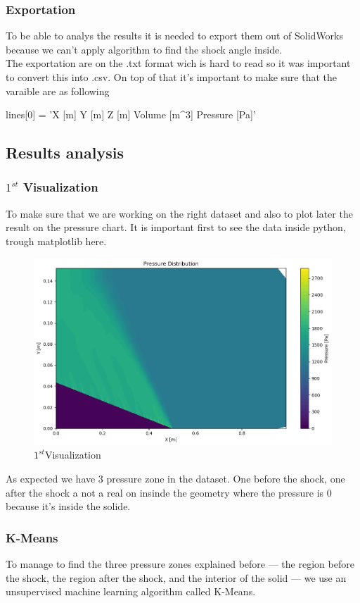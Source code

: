 \subsubsection{Exportation}
To be able to analys the results it is needed to export them out of SolidWorks because we can't apply algorithm to find the shock angle inside. \\
The exportation are on the .txt format wich is hard to read so it was important to convert this into .csv. On top of that it's important to make sure that the varaible are as following

\begin{pycode}
lines[0] = 'X [m] Y [m] Z [m] Volume [m^3] Pressure [Pa]\n'
\end{pycode}



\subsection{Results analysis}

\subsubsection{$1^{st}$ Visualization}
To make sure that we are working on the right dataset and also to plot later the result on the pressure chart. It is important first to see the data inside python, trough matplotlib here.

\begin{figure}[H]
	\centering
	\includegraphics[width=0.5\linewidth]{ressources/figures/PressureDistribution.png}
	\caption{$1^{st}$Visualization}
	\label{fig:resSW}
\end{figure}

As expected we have 3 pressure zone in the dataset. One before the shock, one after the shock a not a real on insinde the geometry where the pressure is 0 because it's inside the solide.

\subsubsection{K-Means}
To manage to find the three pressure zones explained before — the region before the shock, the region after the shock, and the interior of the solid — we use an unsupervised machine learning algorithm called K-Means.

